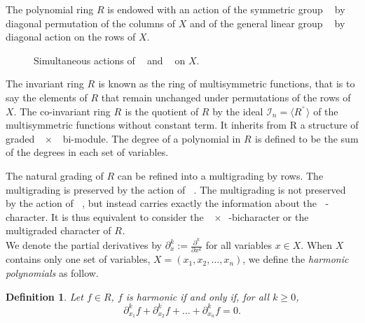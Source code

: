 \documentclass[letter,12pt]{article}
\DeclareMathOperator{\Sn}{\mathbb{S}_n}
\DeclareMathOperator{\GLr}{GL_r}
\newtheorem{definition}{Definition}
\begin{document}
	The polynomial ring $R$ is endowed with an action of the symmetric group $\Sn$ by diagonal permutation of the columns of $X$ and of the general linear group $\GLr$ by diagonal action on the rows of $X$. 
	\begin{figure}[H]
		\centering
		\caption{Simultaneous actions of $\GLr$ and $\Sn$ on $X$.}
	\end{figure}
	
	The invariant ring $R^{\Sn}$ is known as the ring of multisymmetric functions, that is to say the elements of $R$ that remain unchanged under permutations of the rows of $X$. The co-invariant ring $R_{\Sn}$ is the quotient of $R$ by the ideal $\mathcal{I}_n = \langle {R^{\Sn^+}} \rangle$ of the multisymmetric functions without constant term. It inherits from R a structure of graded $\GLr \times \Sn$ bi-module. The degree of a polynomial in $R_{\Sn}$ is defined to be the sum of the degrees in each set of variables. 
	
	The natural grading of $R$ can be refined into a multigrading by rows. The multigrading is preserved by the action of $\Sn$. The multigrading is not preserved by the action of $\GLr$, but instead carries exactly the information about the $\GLr$-character. It is thus equivalent to consider the $\GLr \times \Sn$-bicharacter or the $\Sn$ multigraded character of $R_{\Sn}$. \\
	
	
	We denote the partial derivatives by $\partial^k_x := \frac{\partial^k}{\partial x^k}$ for all variables $x \in X$.
	When $X$ contains only one set of variables, $X = (x_1, x_2, \dots, x_n)$, we define the \emph{harmonic polynomials} as follow.
	
	\begin{definition}
		Let $f \in R$, $f$ is \emph{harmonic} if and only if, for all $k \geq 0$,
		$$\partial^k_{x_1} f + \partial^k_{x_2} f + \dots + \partial^k_{x_n} f = 0.$$
	\end{definition}
\end{document}
